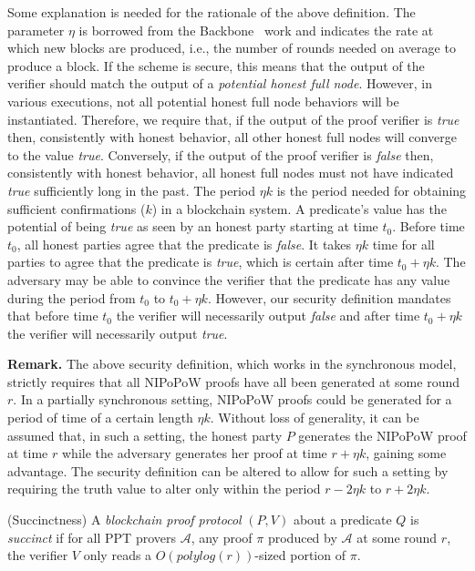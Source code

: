 Some explanation is needed for the rationale of the above definition. The
parameter $\eta$ is borrowed from the Backbone~\cite{backbone} work and
indicates the rate at which new blocks are produced, i.e., the number of rounds
needed on average to produce a block. If the scheme is secure, this means that
the output of the verifier should match the output of a \emph{potential honest
full node}. However, in various executions, not all potential honest full node
behaviors will be instantiated. Therefore, we require that, if the output of the
proof verifier is \emph{true} then, consistently with honest behavior, all other
honest full nodes will converge to the value \emph{true}. Conversely, if the
output of the proof verifier is \emph{false} then, consistently with honest
behavior, all honest full nodes must not have indicated \emph{true} sufficiently
long in the past. The period $\eta k$ is the period needed for obtaining
sufficient confirmations ($k$) in a blockchain system. A predicate's value has
the potential of being \emph{true} as seen by an honest party starting at time
$t_0$. Before time $t_0$, all honest parties agree that the predicate is
\emph{false}. It takes $\eta k$ time for all parties to agree that the predicate
is \emph{true}, which is certain after time $t_0 + \eta k$. The adversary may be
able to convince the verifier that the predicate has any value during the period
from $t_0$ to $t_0 + \eta k$. However, our security definition mandates that
before time $t_0$ the verifier will necessarily output \emph{false} and after
time $t_0 + \eta k$ the verifier will necessarily output \emph{true}.

\noindent
\textbf{Remark. } The above security definition, which works in the synchronous
model, strictly requires that all NIPoPoW proofs have all been generated at some
round $r$. In a partially synchronous setting, NIPoPoW proofs could be generated
for a period of time of a certain length $\eta k$. Without loss of generality,
it can be assumed that, in such a setting, the honest party $P$ generates the
NIPoPoW proof at time $r$ while the adversary generates her proof at time
$r + \eta k$, gaining some advantage. The security definition can be altered to
allow for such a setting by requiring the truth value to alter only within the
period $r - 2\eta k$ to $r + 2\eta k$.

\begin{definition}{(Succinctness)}
A \emph{blockchain proof protocol} $(P, V)$ about a predicate $Q$ is
\emph{succinct} if for all PPT provers $\mathcal{A}$, any proof $\pi$ produced
by $\mathcal{A}$ at some round $r$, the verifier $V$ only reads a
$O(polylog(r))$-sized portion of $\pi$.
\end{definition}

